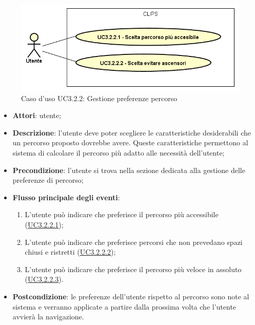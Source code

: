 \documentclass[../AnalisiDeiRequisiti.tex]{subfiles}
\begin{document}
\begin{figure}[H]
	\centering
	\includegraphics[scale=0.95, width=\textwidth]{img/UC3-2-2.png}
	\caption{Caso d'uso UC3.2.2: Gestione preferenze percorso}\label{fig:UC3.2.2} 
\end{figure}
\begin{itemize}
	\item \textbf{Attori}: utente;
	\item \textbf{Descrizione}: l'utente deve poter scegliere le caratteristiche desiderabili che un percorso proposto dovrebbe avere. Queste caratteristiche permettono al sistema di calcolare il percorso più adatto alle necessità dell'utente; 
	\item \textbf{Precondizione}: l'utente si trova nella sezione dedicata alla gestione delle preferenze di percorso;
	
	\item \textbf{Flusso principale degli eventi}:
	\begin{enumerate}
		\item L'utente può indicare che preferisce il percorso più accessibile (\hyperlink{UC3.2.2.1}{UC3.2.2.1});
		\item L'utente può indicare che preferisce percorsi che non prevedano spazi chiusi e ristretti  (\hyperlink{UC3.2.2.2}{UC3.2.2.2});
		\item L'utente può indicare che preferisce il percorso più veloce in assoluto (\hyperlink{UC3.2.2.3}{UC3.2.2.3}).
		
	\end{enumerate}
	\item \textbf{Postcondizione}: le preferenze dell'utente rispetto al percorso sono note al sistema e verranno applicate a partire dalla prossima volta che l'utente avvierà la navigazione.
\end{itemize}
\hypertarget{UC3.2.2.1}{}
\end{document}
